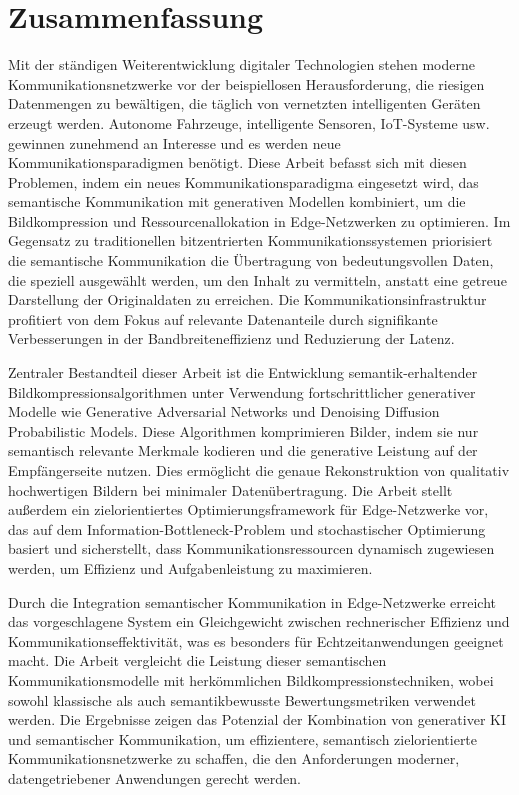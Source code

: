 \thispagestyle{plain}			%
\setlength{\parskip}{0pt plus 1.0pt}
\section*{Zusammenfassung}
Mit der ständigen Weiterentwicklung digitaler Technologien stehen moderne Kommunikationsnetzwerke vor der beispiellosen Herausforderung, die riesigen Datenmengen zu bewältigen, die täglich von vernetzten intelligenten Geräten erzeugt werden. Autonome Fahrzeuge, intelligente Sensoren, IoT-Systeme usw. gewinnen zunehmend an Interesse und es werden neue Kommunikationsparadigmen benötigt. Diese Arbeit befasst sich mit diesen Problemen, indem ein neues Kommunikationsparadigma eingesetzt wird, das semantische Kommunikation mit generativen Modellen kombiniert, um die Bildkompression und Ressourcenallokation in Edge-Netzwerken zu optimieren. Im Gegensatz zu traditionellen bitzentrierten Kommunikationssystemen priorisiert die semantische Kommunikation die Übertragung von bedeutungsvollen Daten, die speziell ausgewählt werden, um den Inhalt zu vermitteln, anstatt eine getreue Darstellung der Originaldaten zu erreichen. Die Kommunikationsinfrastruktur profitiert von dem Fokus auf relevante Datenanteile durch signifikante Verbesserungen in der Bandbreiteneffizienz und Reduzierung der Latenz.

Zentraler Bestandteil dieser Arbeit ist die Entwicklung semantik-erhaltender Bildkompressionsalgorithmen unter Verwendung fortschrittlicher generativer Modelle wie Generative Adversarial Networks und Denoising Diffusion Probabilistic Models. Diese Algorithmen komprimieren Bilder, indem sie nur semantisch relevante Merkmale kodieren und die generative Leistung auf der Empfängerseite nutzen. Dies ermöglicht die genaue Rekonstruktion von qualitativ hochwertigen Bildern bei minimaler Datenübertragung. Die Arbeit stellt außerdem ein zielorientiertes Optimierungsframework für Edge-Netzwerke vor, das auf dem Information-Bottleneck-Problem und stochastischer Optimierung basiert und sicherstellt, dass Kommunikationsressourcen dynamisch zugewiesen werden, um Effizienz und Aufgabenleistung zu maximieren.

Durch die Integration semantischer Kommunikation in Edge-Netzwerke erreicht das vorgeschlagene System ein Gleichgewicht zwischen rechnerischer Effizienz und Kommunikationseffektivität, was es besonders für Echtzeitanwendungen geeignet macht. Die Arbeit vergleicht die Leistung dieser semantischen Kommunikationsmodelle mit herkömmlichen Bildkompressionstechniken, wobei sowohl klassische als auch semantikbewusste Bewertungsmetriken verwendet werden. Die Ergebnisse zeigen das Potenzial der Kombination von generativer KI und semantischer Kommunikation, um effizientere, semantisch zielorientierte Kommunikationsnetzwerke zu schaffen, die den Anforderungen moderner, datengetriebener Anwendungen gerecht werden.

\thispagestyle{empty}
\mbox{}